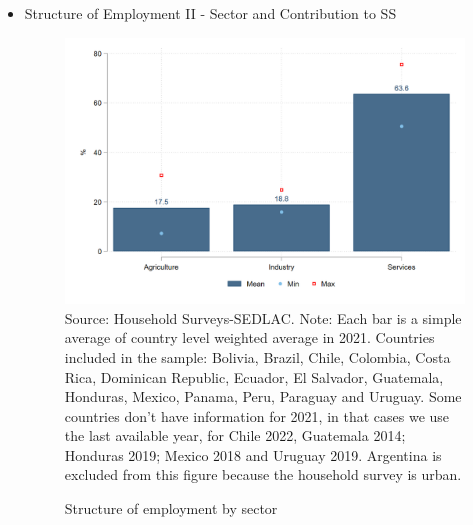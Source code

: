\documentclass[english]{article}
\begin{document}
\begin{itemize}
\begin{figure}[htb!]
\end{figure}
         

        
\item Structure of Employment II - Sector and Contribution to SS

\begin{figure}[!htb]
        \justifying
        \caption{Structure of employment by sector}     
        \includegraphics[scale=.3]{latex/figures/Snapshot/Structure of employment and sector.png}
        \label{fig:sector}
       \footnotesize{Source: Household Surveys-SEDLAC.}
        \footnotesize{Note: Each bar is a simple average of country level weighted average in 2021. Countries included in the sample: Bolivia, Brazil, Chile, Colombia, Costa Rica, Dominican Republic, Ecuador, El Salvador, Guatemala, Honduras, Mexico, Panama, Peru, Paraguay and Uruguay. Some countries don’t have information for 2021, in that cases we use the last available year, for Chile 2022, Guatemala 2014; Honduras 2019; Mexico 2018 and Uruguay 2019. Argentina is excluded from this figure because the household survey is urban.}
\end{figure}


\end{itemize}
\end{document}
